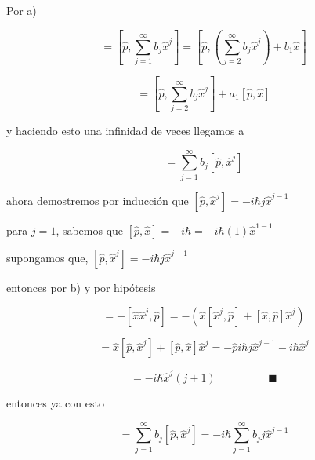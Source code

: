 \documentclass[12pt,a4paper]{article}
\begin{document}
\begin{enumerate}
    Por a) 
        
        \begin{equation*}
            [\hat{p}, \hat{G}(\hat{x})] = [\hat{p},\sum_{j=1}^{\infty} b_j \hat{x}^j ] = [\hat{p},(\sum_{j=2}^{\infty} b_j \hat{x}^j) + b_1 \hat{x} ]
        \end{equation*}
        
        \begin{equation*}
            =[\hat{p},\sum_{j=2}^{\infty} b_j \hat{x}^j] + a_1[\hat{p}, \hat{x}]
        \end{equation*}
        
        y haciendo esto una infinidad de veces llegamos a
        
        \begin{equation*}
            [\hat{p}, \hat{G}(\hat{x})] = \sum_{j=1}^{\infty} b_j [\hat{p}, \hat{x}^j]
        \end{equation*}
        
        ahora demostremos por inducción que $[\hat{p}, \hat{x}^j] = -i \hbar j \hat{x}^{j-1} $
        
        para $j=1$, sabemos que $[\hat{p}, \hat{x}] = -i \hbar =- i \hbar (1) \hat{x}^{1-1}$
        
        supongamos que, $[\hat{p}, \hat{x}^j] = -i \hbar j \hat{x}^{j-1}$
        
        entonces por b) y por hipótesis
        
        \begin{equation*}
            [\hat{p}, \hat{x}^{j+1}] = -[\hat{x}\hat{x}^{j},\hat{p}]=-(\hat{x}[\hat{x}^{j}, \hat{p}]+[\hat{x},\hat{p}]\hat{x}^{j})
        \end{equation*}
        
        \begin{equation*}
            =\hat{x}[\hat{p},\hat{x}^{j}] + [\hat{p}, \hat{x}] \hat{x}^{j}=-\hat{p} i \hbar j \hat{x}^{j-1} - i \hbar \hat{x}^{j}
        \end{equation*}
        
        \begin{equation*}
            =- i \hbar \hat{x}^{j} (j+1) \hspace{2cm} \blacksquare
        \end{equation*}
        
        entonces ya con esto
        
        \begin{equation*}
            [\hat{p}, \hat{G}(\hat{x})] = \sum_{j=1}^{\infty} b_j [\hat{p}, \hat{x}^j] =    -i  \hbar \sum_{j=1}^{\infty} b_j  j \hat{x}^{j-1}
        \end{equation*}
        

\end{enumerate}
\end{document}
